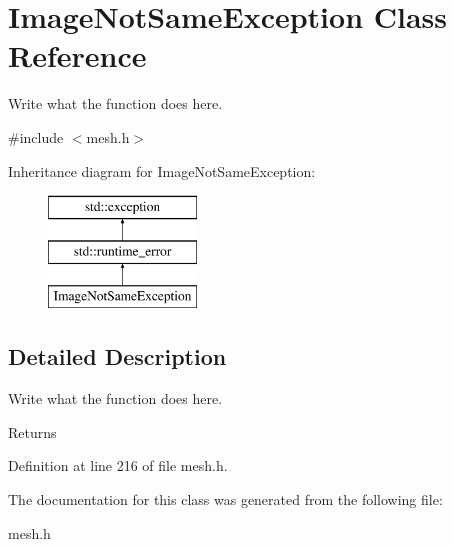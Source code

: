 \hypertarget{classImageNotSameException}{\section{Image\+Not\+Same\+Exception Class Reference}
\label{classImageNotSameException}
}


Write what the function does here.  




{\ttfamily \#include $<$mesh.\+h$>$}

Inheritance diagram for Image\+Not\+Same\+Exception\+:\begin{figure}[H]
\begin{center}
\leavevmode
\includegraphics[height=3.000000cm]{classImageNotSameException}
\end{center}
\end{figure}


\subsection{Detailed Description}
Write what the function does here. 

\begin{DoxyReturn}{Returns}

\end{DoxyReturn}


Definition at line 216 of file mesh.\+h.



The documentation for this class was generated from the following file\+:\begin{DoxyCompactItemize}
\item 
mesh.\+h\end{DoxyCompactItemize}
